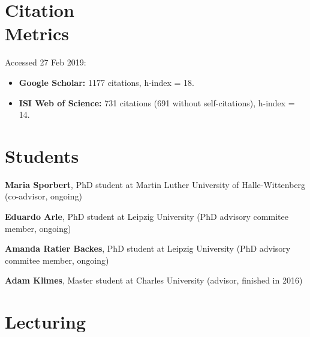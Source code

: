 \HRule

\section{Citation \\ Metrics}

Accessed 27 Feb 2019:

\begin{itemize}
\item \textbf{Google Scholar:} 1177 citations, h-index  = 18.
\item \textbf{ISI Web of Science:} 731 citations (691 without self-citations), h-index = 14.
\end{itemize}


\HRule

\section{Students}

\begin{innerlist}

\item[]{\bf Maria Sporbert}, PhD student at Martin Luther University of Halle-Wittenberg (co-advisor, ongoing)

\item[]{\bf Eduardo Arle}, PhD student at Leipzig University (PhD advisory commitee member, ongoing)

\item[]{\bf Amanda Ratier Backes}, PhD student at Leipzig University (PhD advisory commitee member, ongoing)

\medskip

\item[]{\bf Adam Klimes}, Master student at Charles University (advisor, finished in 2016)

\end{innerlist}

\HRule

\section{Lecturing}

